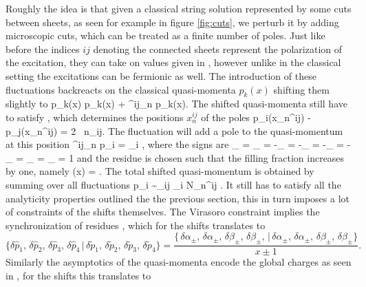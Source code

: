 Roughly the idea is that given a classical string solution represented by some cuts between sheets, as seen for example in figure \ref{fig:cuts}, we perturb it by adding microscopic cuts, which can be treated as a finite number of poles.
Just like before the indices $ij$ denoting the connected sheets represent the polarization of the excitation, they can take on values given in , however unlike in the classical setting the excitations can be fermionic as well.
The introduction of these fluctuations backreacts on the classical quasi-momenta $p_k(x)$ shifting them slightly to
\beq
	p_k(x) \rightarrow p_k(x) + \delta^{ij}_n p_k(x).
\eeq
The shifted quasi-momenta still have to satisfy , which determines the positions $x_n^{ij}$ of the poles
\beq
	p_i(x_n^{ij}) - p_j(x_n^{ij}) = 2 \pi \, n_{ij}.
\eeq
The fluctuation will add a pole to the quasi-momentum at this position
\beq
	\delta^{ij}_n p_i = \epsilon_i ,
\eeq
where the signs are
\beq
	\epsilon_{} = \epsilon_{} = -\epsilon_{} = -\epsilon_{} = -\epsilon_{} = -\epsilon_{} = \epsilon_{} = \epsilon_{} = 1
\eeq
and the residue is chosen such that the filling fraction  increases by one, namely
\beq
	\alpha(x) = \frac{4\pi}{\sqrt{\lambda}} .
\eeq
The total shifted quasi-momentum is obtained by summing over all fluctuations
\beq
	\delta p_i \sim \sum_{ij} \epsilon_i N_n^{ij} .
\eeq
It still has to satisfy all the analyticity properties outlined the the previous section, this in turn imposes a lot of constraints of the shifts themselves.
The Virasoro constraint implies the synchronization of residues , which for the shifts translates to
\begin{equation}
	\{ \delta\hat{p}_1, \, \delta\hat{p}_2, \, \delta\hat{p}_3, \, \delta\hat{p}_4 \, | \, \delta\tilde{p}_1, \, \delta\tilde{p}_2, \, \delta\tilde{p}_3, \, \delta\tilde{p}_4 \} = \frac{\{ \, \delta\alpha_{\pm}, \, \delta\alpha_{\pm}, \, \delta\beta_{\pm}, \, \delta\beta_{\pm}, \, | \, \delta\alpha_{\pm}, \, \delta\alpha_{\pm}, \, \delta\beta_{\pm}, \, \delta\beta_{\pm} \}}{x \pm 1}.
\end{equation}
Similarly the asymptotics of the quasi-momenta encode the global charges as seen in , for the shifts this translates to
